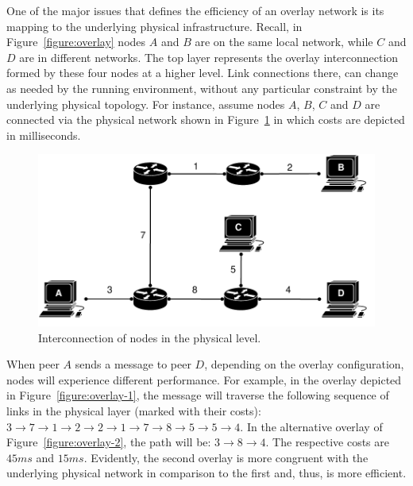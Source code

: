 One of the major issues that defines the efficiency of 
an overlay network is its mapping to 
the underlying physical infrastructure. 
Recall, in Figure~\ref{figure:overlay} nodes $A$ and $B$ are 
on the same local network, while $C$ and $D$ are in different networks. 
The top layer represents the overlay interconnection formed by 
these four nodes at a higher level. 
Link connections there, can change as needed by 
the running environment, without any
particular constraint by the underlying physical topology. 
For instance, assume nodes $A$, $B$, $C$ and $D$ are 
connected via the physical network shown in Figure~\ref{figure:phys}
in which costs are depicted in milliseconds. 
\begin{figure}[ht]
\centering
  \includegraphics[scale=0.36]{img/pdf/example-physical.pdf}
\caption{Interconnection of nodes in the physical level.}
\label{figure:phys}
\end{figure}
When peer $A$ sends a message to peer $D$, 
depending on the overlay configuration, 
nodes will experience different performance.
For example, in the overlay depicted in
Figure~\ref{figure:overlay-1}, the
message will traverse the following sequence of links in the physical layer
(marked with their costs): $3 \rightarrow 7 \rightarrow 1 \rightarrow 2
\rightarrow 2 \rightarrow 1 \rightarrow 7 \rightarrow 8 \rightarrow 5
\rightarrow 5 \rightarrow 4$. In the alternative overlay of
Figure~\ref{figure:overlay-2}, the path will be: $3 \rightarrow 8 \rightarrow
4$. 
The respective costs are $45 ms$ and $15 ms$.
Evidently, the second overlay is more
congruent with the underlying physical network in comparison 
to the first and, thus, is more efficient. 

